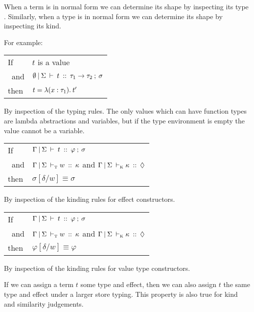 


When a term is in normal form we can determine its shape by inspecting its type \cite{pierce:tapl}. Similarly, when a type is in normal form we can determine its shape by inspecting its kind.

For example:

\begin{tabular}{ll}
	If	& $t$ is a value \\
	 \ and	& $\emptyset \: \arrowvert \: \Sigma \: \vdash \: t \: :: \: \tau_1 \to \tau_2 \: ; \: \sigma$ \\
	then	& $t = \lambda(x : \tau_1). \: t'$
\end{tabular}

By inspection of the typing rules. The only values which can have function types are lambda abstractions and variables, but if the type environment is empty the value cannot be a variable. 

\clearpage{}

\begin{tabular}{ll}
	If 	& $\Gamma \: \arrowvert \: \Sigma \: \vdash \: t \: :: \: \varphi \: ; \: \sigma$ \\
	\ and	& $\Gamma \: \arrowvert \: \Sigma \: \vdash_\textrm{\tiny{T}}w \: :: \: \kappa$ and $\Gamma \: \arrowvert \: \Sigma \: \vdash_\textrm{\tiny{K}}\kappa \: :: \: \Diamond$ \\[1ex]
	then	& $\sigma[\delta/w] \equiv \sigma$
\end{tabular}

By inspection of the kinding rules for effect constructors.



\begin{tabular}{ll}
	If 	& $\Gamma \: \arrowvert \: \Sigma \: \vdash \: t \: :: \: \varphi \: ; \: \sigma$ \\
	\ and	& $\Gamma \: \arrowvert \: \Sigma \: \vdash_\textrm{\tiny{T}}w \: :: \: \kappa$ and $\Gamma \: \arrowvert \: \Sigma \: \vdash_\textrm{\tiny{K}}\kappa \: :: \: \Diamond$ \\[1ex]
	then	& $\varphi[\delta/w] \equiv \varphi$
\end{tabular}

By inspection of the kinding rules for value type constructors.



If we can assign a term $t$ some type and effect, then we can also assign $t$ the same type
and effect under a larger store typing. This property is also true for kind and similarity judgements.

